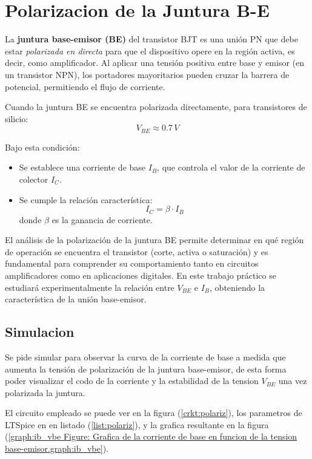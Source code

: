 \chapter{Polarizacion de la Juntura B-E}
  La \textbf{juntura base-emisor (BE)} del transistor BJT es una unión PN que debe estar \textit{polarizada en directa}
  para que el dispositivo opere en la región activa, es decir, como amplificador. Al aplicar una tensión positiva entre
  base y emisor (en un transistor NPN), los portadores mayoritarios pueden cruzar la barrera de potencial, permitiendo
  el flujo de corriente.
  
  Cuando la juntura BE se encuentra polarizada directamente, para transistores de silicio:
  \begin{equation}
    V_{BE} \approx 0.7 \, V
  \end{equation}
  
  Bajo esta condición:
  \begin{itemize}
    \item Se establece una corriente de base $I_B$, que controla el valor de la corriente de colector $I_C$.
    \item Se cumple la relación característica:
      \begin{equation}
        I_C = \beta \cdot I_B
      \end{equation}
      donde $\beta$ es la ganancia de corriente.
  \end{itemize}
  
  El análisis de la polarización de la juntura BE permite determinar en qué región de operación se encuentra el
  transistor (corte, activa o saturación) y es fundamental para comprender su comportamiento tanto en circuitos
  amplificadores como en aplicaciones digitales. En este trabajo práctico se estudiará experimentalmente la relación
  entre $V_{BE}$ e $I_B$, obteniendo la característica de la unión base-emisor.

  \section{Simulacion}
    Se pide simular para observar la curva de la corriente de base a medida que aumenta la tensión de polarización de la
    juntura base-emisor, de esta forma poder visualizar el codo de la corriente y la estabilidad de la tension $V_{BE}$
    una vez polarizada la juntura. 

    El circuito empleado se puede ver en la figura (\ref{crkt:polariz}), los parametros
    de LTSpice en en listado (\ref{list:polariz}), y la grafica resultante en la figura (\ref{graph:ib_vbe Figure:
    Grafica de la corriente de base en funcion de la tension base-emisor.graph:ib_vbe}).

